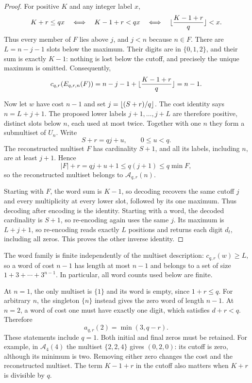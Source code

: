 \documentclass[11pt,a4paper]{article}
\theoremstyle{remark}
\newcommand{\A}{\mathcal A}
\DeclarePairedDelimiter{\floor}{\lfloor}{\rfloor}
\begin{document}
\begin{proof}
For positive $K$ and any integer label $x$,
\begin{equation}\label{eq:threshold}
 K+r\le qx\quad\Longleftrightarrow\quad
 K-1+r<qx\quad\Longleftrightarrow\quad
 \floor{\frac{K-1+r}{q}}<x.
\end{equation}
Thus every member of $F$ lies above $j$, and $j<n$ because $n\in F$.
There are $L=n-j-1$ slots below the maximum. Their digits are in
$\{0,1,2\}$, and their sum is exactly $K-1$: nothing is lost below the
cutoff, and precisely the unique maximum is omitted. Consequently,
\[
 c_{q,r}(E_{q,r,n}(F))
   =n-j-1+\floor{\frac{K-1+r}{q}}=n-1.
\]

Now let $w$ have cost $n-1$ and set $j=\floor{(S+r)/q}$. The cost
identity says $n=L+j+1$. The proposed lower labels $j+1,\ldots,j+L$
are therefore positive, distinct slots below $n$, each used at most twice.
Together with one $n$ they form a submultiset of $U_n$. Write
\[
 S+r=qj+u,\qquad 0\le u<q.
\]
The reconstructed multiset $F$ has cardinality $S+1$, and all its labels,
including $n$, are at least $j+1$. Hence
\[
 |F|+r=qj+u+1\le q(j+1)\le q\min F,
\]
so the reconstructed multiset belongs to $\A_{q,r}(n)$.

Starting with $F$, the word sum is $K-1$, so decoding recovers the same
cutoff $j$ and every multiplicity at every lower slot, followed by its one
maximum. Thus decoding after encoding is the identity. Starting with a
word, the decoded cardinality is $S+1$, so re-encoding again uses the same
$j$. Its maximum is $L+j+1$, so re-encoding reads exactly $L$ positions and
returns each digit $d_t$, including all zeros. This proves the other
inverse identity.
\end{proof}

The word family is finite independently of the multiset description:
$c_{q,r}(w)\ge L$, so a word of cost $n-1$ has length at most $n-1$ and
belongs to a set of size $1+3+\cdots+3^{n-1}$. In particular, all word counts used below are finite.

At $n=1$, the only multiset is $\{1\}$ and its word is empty, since
$1+r\le q$. For arbitrary $n$, the singleton $\{n\}$ instead gives the
zero word of length $n-1$. At $n=2$, a word of cost one must have exactly
one digit, which satisfies $d+r<q$. Therefore
\begin{equation}\label{eq:n2}
 a_{q,r}(2)=\min(3,q-r).
\end{equation}
These statements include $q=1$. Both initial and final zeros must be
retained. For example, in $\A_4(4)$ the multiset $\{2,2,4\}$ gives
$(0,2,0)$: its cutoff is zero, although its minimum is two. Removing
either zero changes the cost and the reconstructed multiset. The term
$K-1+r$ in the cutoff also matters when $K+r$ is divisible by $q$.
\end{document}
